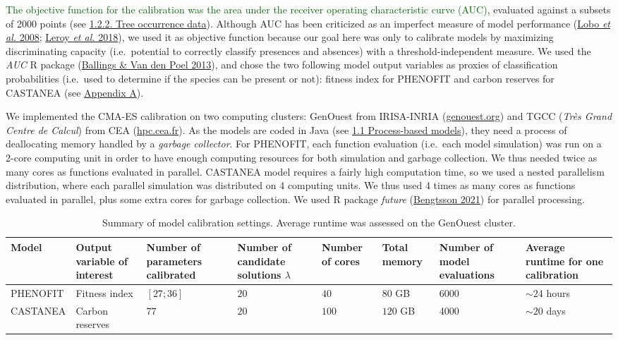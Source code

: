 \documentclass[11pt,]{article}
\begin{document}
\textcolor{darkgreen}{The objective function for the calibration was the area under the receiver operating characteristic curve (AUC)},
evaluated against a subsets of 2000 points (see
\protect\hyperlink{occurrencedata}{1.2.2. Tree occurrence data}).
Although AUC has been criticized as an imperfect measure of model
performance (\protect\hyperlink{ref-Lobo2008}{Lobo \emph{et al.} 2008};
\protect\hyperlink{ref-Leroy2018}{Leroy \emph{et al.} 2018}), we used it
as objective function because our goal here was only to calibrate models
by maximizing discriminating capacity (i.e.~potential to correctly
classify presences and absences) with a threshold-independent measure.
We used the \emph{AUC} R package
(\protect\hyperlink{ref-Ballings2013}{Ballings \& Van den Poel 2013}),
and chose the two following model output variables as proxies of
classification probabilities (i.e.~used to determine if the species can
be present or not): fitness index for PHENOFIT and carbon reserves for
CASTANEA (see \protect\hyperlink{appendixA}{Appendix A}).

We implemented the CMA-ES calibration on two computing clusters:
GenOuest from IRISA-INRIA
(\href{https://www.genouest.org}{genouest.org}) and TGCC (\emph{Très
Grand Centre de Calcul}) from CEA
(\href{http://www-hpc.cea.fr/fr/complexe/tgcc.htm}{hpc.cea.fr}). As the
models are coded in Java (see \protect\hyperlink{pbmodels}{1.1
Process-based models}), they need a process of deallocating memory
handled by a \emph{garbage collector}. For PHENOFIT, each function
evaluation (i.e.~each model simulation) was run on a 2-core computing
unit in order to have enough computing resources for both simulation and
garbage collection. We thus needed twice as many cores as functions
evaluated in parallel. CASTANEA model requires a fairly high computation
time, so we used a nested parallelism distribution, where each parallel
simulation was distributed on 4 computing units. We thus used 4 times as
many cores as functions evaluated in parallel, plus some extra cores for
garbage collection. We used R package \emph{future}
(\protect\hyperlink{ref-Bengtsson2021}{Bengtsson 2021}) for parallel
processing.

\begin{table}

\caption{\label{tab:modelstable}Summary of model calibration settings. Average runtime was assessed on the GenOuest cluster.}
\centering
\begin{tabu} to 
\toprule
Model & Output variable of interest & Number of parameters calibrated & Number of candidate solutions $\lambda$ & Number of cores & Total memory & Number of model evaluations & Average runtime for one calibration\\
\midrule
PHENOFIT & Fitness index & $[27;36]$ & $20$ & $40$ & $80$ GB & 6000 & $\sim 24$ hours\\
\addlinespace
CASTANEA & Carbon reserves & $77$ & $20$ & $100$ & $120$ GB & 4000 & $\sim 20$ days\\
\bottomrule
\end{tabu}
\end{table}
\end{document}
